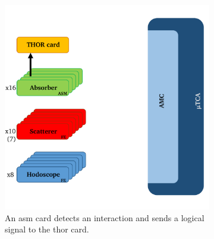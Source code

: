 \begin{figure}
\begin{subfigure}[b]{0.5\textwidth}
 \centering
\includegraphics[width=0.9\linewidth]{03_GraphicFiles/appendixA_dataFormat/triggerLogic_1.pdf}
\caption[Signal detection on one \gls{asm} card and logical signal sent to the \gls{thor} card.]{An \gls{asm} card detects an interaction and sends a logical signal to the \gls{thor} card.}
\label{chapappA::subfig::triggerLogic_1}
\end{subfigure}%
\begin{subfigure}[b]{0.5\textwidth}

\end{subfigure}
\end{figure}
